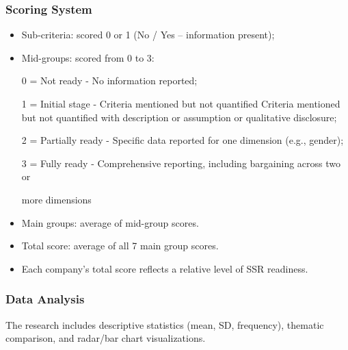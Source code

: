 \subsubsection{Scoring System}
    \begin{itemize}
        \item Sub-criteria: scored 0 or 1 (No / Yes -- information present);
        \item Mid-groups: scored from 0 to 3:
        
        \hspace{1cm} 0 = Not ready - No information reported;
        
        \hspace{1cm} 1 = Initial stage - Criteria mentioned but not quantified Criteria mentioned but not quantified with description 
        or assumption or qualitative disclosure;
        
        \hspace{1cm} 2 = Partially ready - Specific data reported for one dimension (e.g., gender);
        
        \hspace{1cm} 3 = Fully ready - Comprehensive reporting, including bargaining across two or 

        \hspace{1cm} more dimensions

        \item Main groups: average of mid-group scores.
        \item Total score: average of all 7 main group scores.
        \item Each company's total score reflects a relative level of SSR readiness.
    \end{itemize}

\subsubsection{Data Analysis}
The research includes descriptive statistics (mean, SD, frequency), thematic comparison, and radar/bar chart visualizations.


